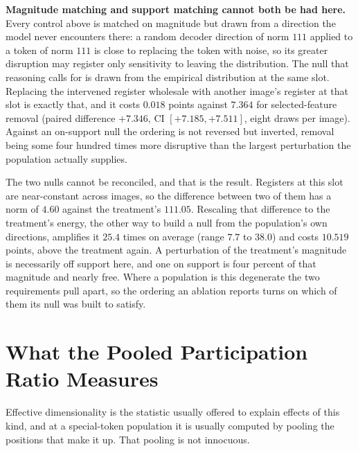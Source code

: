 \documentclass{article}
\begin{document}
\textbf{Magnitude matching and support matching cannot both be had here.} Every control above is matched on magnitude but drawn from a direction the model never encounters there: a random decoder direction of norm $111$ applied to a token of norm $111$ is close to replacing the token with noise, so its greater disruption may register only sensitivity to leaving the distribution. The null that reasoning calls for is drawn from the empirical distribution at the same slot. Replacing the intervened register wholesale with another image's register at that slot is exactly that, and it costs $0.018$ points against $7.364$ for selected-feature removal (paired difference $+7.346$, CI $[+7.185,+7.511]$, eight draws per image). Against an on-support null the ordering is not reversed but inverted, removal being some four hundred times more disruptive than the largest perturbation the population actually supplies.

The two nulls cannot be reconciled, and that is the result. Registers at this slot are near-constant across images, so the difference between two of them has a norm of $4.60$ against the treatment's $111.05$. Rescaling that difference to the treatment's energy, the other way to build a null from the population's own directions, amplifies it $25.4$ times on average (range $7.7$ to $38.0$) and costs $10.519$ points, above the treatment again. A perturbation of the treatment's magnitude is necessarily off support here, and one on support is four percent of that magnitude and nearly free. Where a population is this degenerate the two requirements pull apart, so the ordering an ablation reports turns on which of them its null was built to satisfy.


\section{What the Pooled Participation Ratio Measures}
\label{sec:artifact}
\label{sec:crosslayer}

Effective dimensionality is the statistic usually offered to explain effects of this kind, and at a special-token population it is usually computed by pooling the positions that make it up. That pooling is not innocuous.
\end{document}

